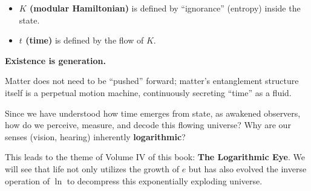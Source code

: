 \begin{itemize}
\item \textbf{$K$ (modular Hamiltonian)} is defined by ``ignorance'' (entropy) inside the state.

\item \textbf{$t$ (time)} is defined by the flow of $K$.
\end{itemize}

\textbf{Existence is generation.}

Matter does not need to be ``pushed'' forward; matter's entanglement structure itself is a perpetual motion machine, continuously secreting ``time'' as a fluid.

Since we have understood how time emerges from state, as awakened observers, how do we perceive, measure, and decode this flowing universe? Why are our senses (vision, hearing) inherently \textbf{logarithmic}?

This leads to the theme of Volume IV of this book: \textbf{The Logarithmic Eye}. We will see that life not only utilizes the growth of $e$ but has also evolved the inverse operation of $\ln$ to decompress this exponentially exploding universe.

